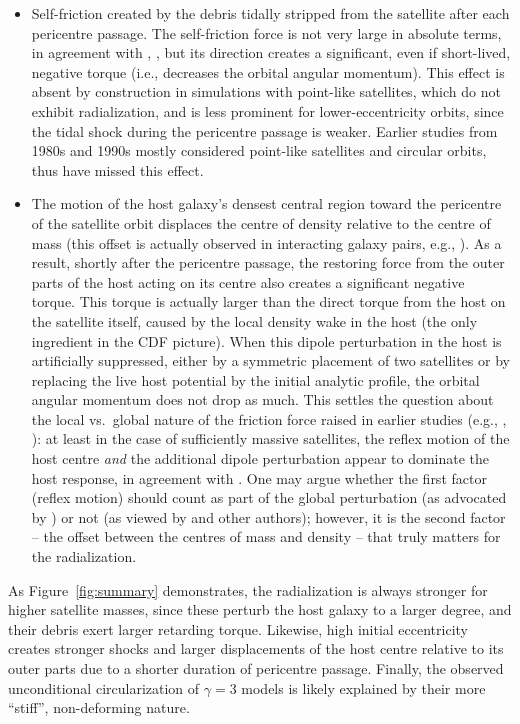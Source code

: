 \documentclass[twocolumn]{aastex63}
\begin{document}
\begin{itemize}
\item Self-friction created by the debris tidally stripped from the satellite after each pericentre passage. The self-friction force is not very large in absolute terms, in agreement with \citet{Fujii2006}, \citet{Miller2020}, but its direction creates a significant, even if short-lived, negative torque (i.e., decreases the orbital angular momentum). This effect is absent by construction in simulations with point-like satellites, which do not exhibit radialization, and is less prominent for lower-eccentricity orbits, since the tidal shock during the pericentre passage is weaker. Earlier studies from 1980s and 1990s mostly considered point-like satellites and circular orbits, thus have missed this effect.
%
\item The motion of the host galaxy's densest central region toward the pericentre of the satellite orbit displaces the centre of density relative to the centre of mass (this offset is actually observed in interacting galaxy pairs, e.g., \citealt{Davoust1988}). As a result, shortly after the pericentre passage, the restoring force from the outer parts of the host acting on its centre also creates a significant negative torque. This torque is actually larger than the direct torque from the host on the satellite itself, caused by the local density wake in the host (the only ingredient in the CDF picture). When this dipole perturbation in the host is artificially suppressed, either by a symmetric placement of two satellites or by replacing the live host potential by the initial analytic profile, the orbital angular momentum does not drop as much. This settles the question about the local vs.\ global nature of the friction force raised in earlier studies (e.g., \citealt{Zaritsky1988}, \citealt{Hernquist1989}): at least in the case of sufficiently massive satellites, the reflex motion of the host centre \textit{and} the additional dipole perturbation appear to dominate the host response, in agreement with \citet{Tamfal2021}. One may argue whether the first factor (reflex motion) should count as part of the global perturbation (as advocated by \citealt{Weinberg1989}) or not (as viewed by \citealt{Prugniel1992} and other authors); however, it is the second factor -- the offset between the centres of mass and density -- that truly matters for the radialization.
\end{itemize}

As Figure~\ref{fig:summary} demonstrates, the radialization is always stronger for higher satellite masses, since these perturb the host galaxy to a larger degree, and their debris exert larger retarding torque. Likewise, high initial eccentricity creates stronger shocks and larger displacements of the host centre relative to its outer parts due to a shorter duration of pericentre passage. Finally, the observed unconditional circularization of $\gamma=3$ models is likely explained by their more ``stiff'', non-deforming nature.
\end{document}
